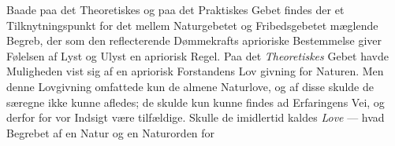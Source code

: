 \documentclass[12pt,a4paper]{book}
\begin{document}
Baade paa det Theoretiskes og paa det Praktiskes Gebet
findes der et Tilknytningspunkt for det mellem Naturgebetet
og Fribedsgebetet mæglende Begreb, der som den reflecterende
Dømmekrafts aprioriske Bestemmelse giver Følelsen af Lyst og
Ulyst en apriorisk Regel. Paa det \emph{Theoretiskes} Gebet
havde Muligheden vist sig af en apriorisk Forstandens Lov\-%
givning for Naturen. Men denne Lovgivning omfattede kun
de almene Naturlove, og af disse skulde de særegne ikke kunne
afledes; de skulde kun kunne findes ad Erfaringens Vei, og derfor
for vor Indsigt være tilfældige. Skulle de imidlertid kaldes
\emph{Love} --- hvad Begrebet af en Natur og en Naturorden for\-%
\end{document}
